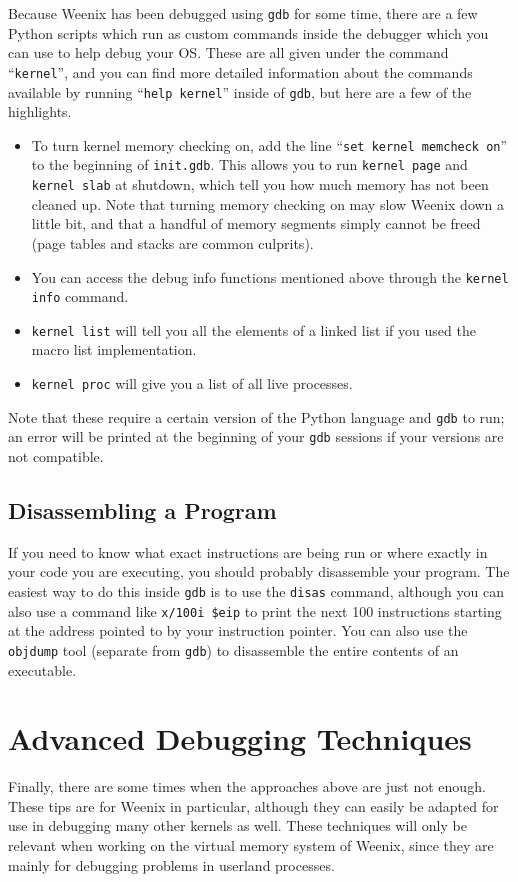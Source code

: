 Because Weenix has been debugged using \texttt{gdb} for some time, there are a few Python scripts which run as custom commands inside the debugger which you can use to help debug your OS. These are all given under the command ``\texttt{kernel}'', and you can find more detailed information about the commands available by running ``\texttt{help kernel}'' inside of \texttt{gdb}, but here are a few of the highlights.
\begin{itemize}
    \item To turn kernel memory checking on, add the line ``\texttt{set kernel memcheck on}'' to the beginning of \texttt{init.gdb}. This allows you to run \texttt{kernel page} and \texttt{kernel slab} at shutdown, which tell you how much memory has not been cleaned up. Note that turning memory checking on may slow Weenix down a little bit, and that a handful of memory segments simply cannot be freed (page tables and stacks are common culprits).
    \item You can access the debug info functions mentioned above through the \texttt{kernel info} command.
    \item \texttt{kernel list} will tell you all the elements of a linked list if you used the macro list implementation.
    \item \texttt{kernel proc} will give you a list of all live processes.
\end{itemize}
Note that these require a certain version of the Python language and \texttt{gdb} to run; an error will be printed at the beginning of your \texttt{gdb} sessions if your versions are not compatible.

\subsection{Disassembling a Program}

If you need to know what exact instructions are being run or where exactly in your code you are executing, you should probably disassemble your program. The easiest way to do this inside \texttt{gdb} is to use the \texttt{disas} command, although you can also use a command like \texttt{x/100i \$eip} to print the next 100 instructions starting at the address pointed to by your instruction pointer. You can also use the \texttt{objdump} tool (separate from \texttt{gdb}) to disassemble the entire contents of an executable.

\section{Advanced Debugging Techniques}
Finally, there are some times when the approaches above are just not enough. These tips are for Weenix in particular, although they can easily be adapted for use in debugging many other kernels as well. These techniques will only be relevant when working on the virtual memory system of Weenix, since they are mainly for debugging problems in userland processes.

